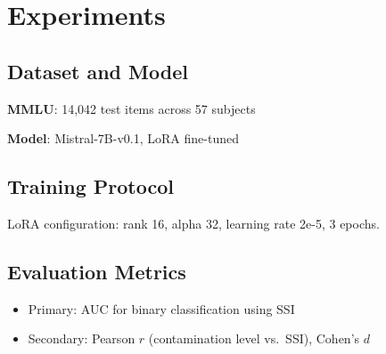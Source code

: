 \section{Experiments}

\subsection{Dataset and Model}

\textbf{MMLU}: 14,042 test items across 57 subjects

\textbf{Model}: Mistral-7B-v0.1, LoRA fine-tuned

\subsection{Training Protocol}

LoRA configuration: rank 16, alpha 32, learning rate 2e-5, 3 epochs.

\subsection{Evaluation Metrics}

\begin{itemize}
    \item Primary: AUC for binary classification using SSI
    \item Secondary: Pearson $r$ (contamination level vs.\ SSI), Cohen's $d$
\end{itemize}
